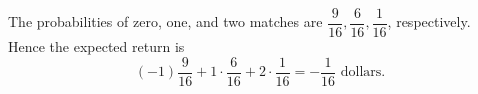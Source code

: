 The probabilities of zero, one, and two matches are $\dfrac{9}{16},\dfrac{6}{16},\dfrac{1}{16}$, respectively. Hence the expected return is
\[
(-1)\dfrac{9}{16}+1\cdot\dfrac{6}{16}+2\cdot\dfrac{1}{16}
=\boxed{-\dfrac{1}{16}}\text{ dollars}.
\]
